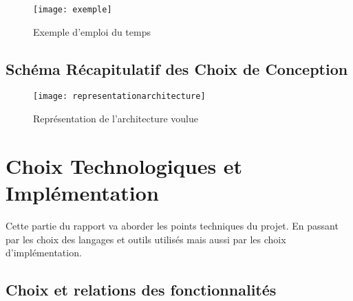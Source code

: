 \documentclass[12pt,a4paper]{article}
\begin{document}
\begin{figure}[h]
    \centering
    \texttt{[image: exemple]}    
    \label{exedt}
    \caption{Exemple d'emploi du temps}
\end{figure}

\subsection{Schéma Récapitulatif des Choix de Conception}

\begin{figure}[h!!]
    \label{architecture}
    \centering
    \texttt{[image: representationarchitecture]}
    \caption{Représentation de l'architecture voulue}
\end{figure}

\section{Choix Technologiques et Implémentation}

Cette partie du rapport va aborder les points techniques du projet. En passant par les choix des langages et outils utilisés mais aussi par les choix d'implémentation.

\subsection{Choix et relations des fonctionnalités}
\end{document}
